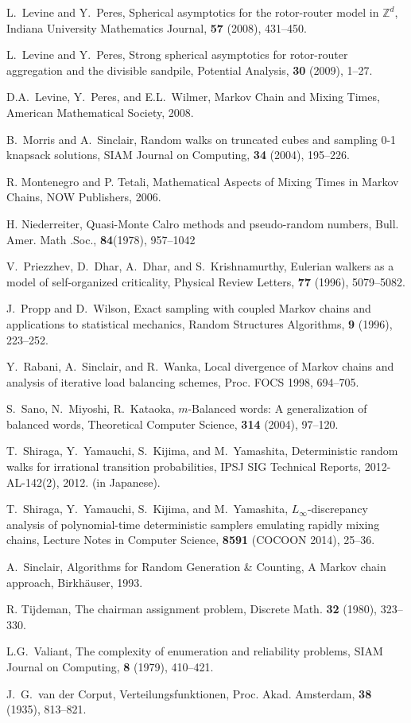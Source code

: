 \documentclass[letter, 11pt]{article}
\newcommand{\1}{\mbox{1}\hspace{-0.25em}\mbox{l}}
\begin{document}
\begin{thebibliography}{99}
 L.~Levine and Y.~Peres, 
 Spherical asymptotics for the rotor-router model in $\mathbb{Z}^d$, 
 Indiana University Mathematics Journal, {\bf 57} (2008), 431--450.

 L.~Levine and Y.~Peres, 
 Strong spherical asymptotics for rotor-router aggregation and the divisible sandpile, 
 Potential Analysis, {\bf 30} (2009), 1--27.

 D.A.~Levine, Y.~Peres, and E.L.~Wilmer, 
 Markov Chain and Mixing Times, 
 American Mathematical Society, 2008. 

 B.~Morris and A.~Sinclair, 
 Random walks on truncated cubes and sampling 0-1 knapsack solutions, 
 SIAM Journal on Computing, {\bf 34} (2004), 195--226. 


 R. Montenegro and P. Tetali, 
 Mathematical Aspects of Mixing Times in Markov Chains, 
NOW Publishers, 2006. 

 H. Niederreiter, 
 Quasi-Monte Calro methods and pseudo-random numbers, 
 Bull. Amer. Math .Soc., {\bf 84}(1978), 957--1042

 V.~Priezzhev, D.~Dhar, A.~Dhar, and S.~Krishnamurthy, 
 Eulerian walkers as a model of self-organized criticality, 
 Physical Review Letters, {\bf 77} (1996), 5079--5082. 

 J.~Propp and D.~Wilson, 
 Exact sampling with coupled Markov chains and applications to statistical mechanics, 
 Random Structures Algorithms, {\bf 9} (1996), 223--252. 

 Y.~Rabani, A.~Sinclair, and R.~Wanka, 
 Local divergence of Markov chains and analysis of iterative load balancing schemes, 
 Proc. FOCS 1998, 694--705.

S.~Sano, N.~Miyoshi, R.~Kataoka, 
$m$-Balanced words: A generalization of balanced words, 
Theoretical Computer Science, {\bf 314} (2004), 97--120. 

 T.~Shiraga, Y.~Yamauchi, S.~Kijima, and M.~Yamashita, 
 Deterministic random walks for irrational transition probabilities, 
 IPSJ SIG Technical Reports, 2012-AL-142(2), 2012. (in Japanese). 

T.~Shiraga, Y.~Yamauchi, S.~Kijima, and M.~Yamashita, 
$L_{\infty}$-discrepancy analysis of polynomial-time deterministic samplers emulating rapidly mixing chains, 
Lecture Notes in Computer Science, {\bf 8591} (COCOON 2014), 25--36. 



 A.~Sinclair, 
 Algorithms for Random Generation \& Counting, A Markov chain approach, 
 Birkh\"{a}user, 1993. 


R. Tijdeman, The chairman assignment problem, 
Discrete Math. {\bf 32} (1980), 323--330.

 L.G.~Valiant, 
 The complexity of enumeration and reliability problems, 
 SIAM Journal on Computing, {\bf 8} (1979), 410--421. 

 J.~G.~van der Corput, 
 Verteilungsfunktionen, Proc. Akad. Amsterdam, {\bf 38} (1935), 813--821. 

\end{thebibliography}
\end{document}
